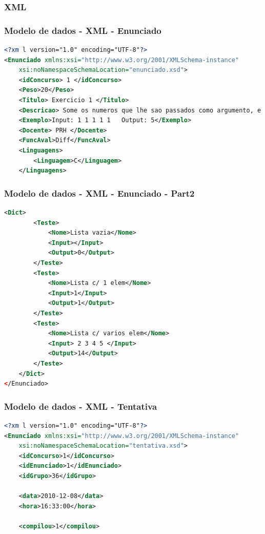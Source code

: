 \documentclass{beamer}
\begin{document}
\subsubsection{XML}
\begin{frame}[fragile] \frametitle{Modelo de dados - XML - Enunciado}
\begin{lstlisting}[language=XML,basicstyle=\tiny,breaklines=true]
<?xm l version="1.0" encoding="UTF-8"?>
<Enunciado xmlns:xsi="http://www.w3.org/2001/XMLSchema-instance"
    xsi:noNamespaceSchemaLocation="enunciado.xsd">
    <idConcurso> 1 </idConcurso>
    <Peso>20</Peso>
    <Titulo> Exercicio 1 </Titulo>
    <Descricao> Some os numeros que lhe sao passados como argumento, e apresente o resultado. </Descricao>
    <Exemplo>Input: 1 1 1 1 1   Output: 5</Exemplo>
    <Docente> PRH </Docente>
    <FuncAval>Diff</FuncAval>  
    <Linguagens> 
        <Linguagem>C</Linguagem>        
    </Linguagens> 
\end{lstlisting}
\end{frame}

\begin{frame}[fragile] \frametitle{Modelo de dados - XML - Enunciado - Part2}
\begin{lstlisting}[language=XML,basicstyle=\tiny,breaklines=true]
    <Dict>
        <Teste>
            <Nome>Lista vazia</Nome>
            <Input></Input>
            <Output>0</Output>
        </Teste>
        <Teste>
            <Nome>Lista c/ 1 elem</Nome>
            <Input>1</Input>
            <Output>1</Output>
        </Teste>
        <Teste>
            <Nome>Lista c/ varios elem</Nome>
            <Input> 2 3 4 5 </Input>
            <Output>14</Output>
        </Teste>
    </Dict>
</Enunciado>
\end{lstlisting}
\end{frame}

\begin{frame}[fragile] \frametitle{Modelo de dados - XML - Tentativa}
\begin{lstlisting}[language=XML,basicstyle=\tiny,breaklines=true]
<?xm l version="1.0" encoding="UTF-8"?>
<Enunciado xmlns:xsi="http://www.w3.org/2001/XMLSchema-instance"
    xsi:noNamespaceSchemaLocation="tentativa.xsd">
    <idConcurso>1</idConcurso>
    <idEnunciado>1</idEnunciado>
    <idGrupo>36</idGrupo>
    
    <data>2010-12-08</data>
    <hora>16:33:00</hora>
    
    <compilou>1</compilou>
\end{lstlisting}
\end{frame}
\end{document}
